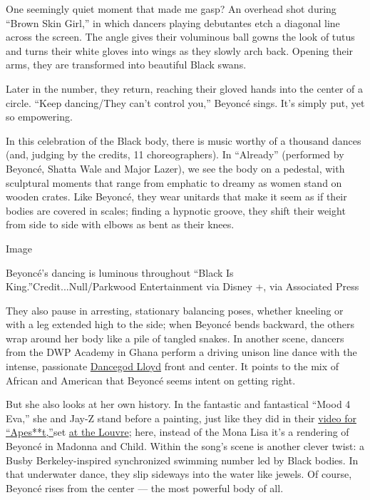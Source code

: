 One seemingly quiet moment that made me gasp? An overhead shot during
``Brown Skin Girl,'' in which dancers playing debutantes etch a diagonal
line across the screen. The angle gives their voluminous ball gowns the
look of tutus and turns their white gloves into wings as they slowly
arch back. Opening their arms, they are transformed into beautiful Black
swans.

Later in the number, they return, reaching their gloved hands into the
center of a circle. ``Keep dancing/They can't control you,'' Beyoncé
sings. It's simply put, yet so empowering.

In this celebration of the Black body, there is music worthy of a
thousand dances (and, judging by the credits, 11 choreographers). In
``Already'' (performed by Beyoncé, Shatta Wale and Major Lazer), we see
the body on a pedestal, with sculptural moments that range from emphatic
to dreamy as women stand on wooden crates. Like Beyoncé, they wear
unitards that make it seem as if their bodies are covered in scales;
finding a hypnotic groove, they shift their weight from side to side
with elbows as bent as their knees.

Image

Beyoncé's dancing is luminous throughout ``Black Is
King.''Credit...Null/Parkwood Entertainment via Disney +, via Associated
Press

They also pause in arresting, stationary balancing poses, whether
kneeling or with a leg extended high to the side; when Beyoncé bends
backward, the others wrap around her body like a pile of tangled snakes.
In another scene, dancers from the DWP Academy in Ghana perform a
driving unison line dance with the intense, passionate
\href{https://www.instagram.com/p/CDTRa6wByKt/}{Dancegod Lloyd} front
and center. It points to the mix of African and American that Beyoncé
seems intent on getting right.

But she also looks at her own history. In the fantastic and fantastical
``Mood 4 Eva,'' she and Jay-Z stand before a painting, just like they
did in their \href{https://www.youtube.com/watch?v=kbMqWXnpXcA}{video
for ``Apes**t,''}set
\href{https://www.nytimes3xbfgragh.onion/2018/06/17/arts/design/louvre-jay-z-beyonce-video.html}{at
the Louvre}; here, instead of the Mona Lisa it's a rendering of Beyoncé
in Madonna and Child. Within the song's scene is another clever twist: a
Busby Berkeley-inspired synchronized swimming number led by Black
bodies. In that underwater dance, they slip sideways into the water like
jewels. Of course, Beyoncé rises from the center --- the most powerful
body of all.

